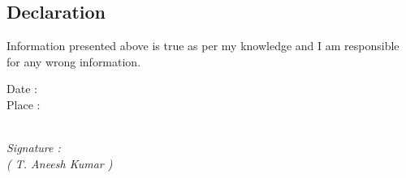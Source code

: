 \documentclass[10pt]{article}
\begin{document}
\subsection*{Declaration}
\hspace{1cm}Information presented above is true as per my knowledge and I am responsible for any wrong information.

\begin{multicols}{2}
 Date : \\
 \indent Place : 
\begin{flushright}
\underline{} \\
\textit{
 Signature : \underline{ \hspace{3cm} } \\
  ( T. Aneesh Kumar )
}
\end{flushright}
\end{multicols}
\end{document}
